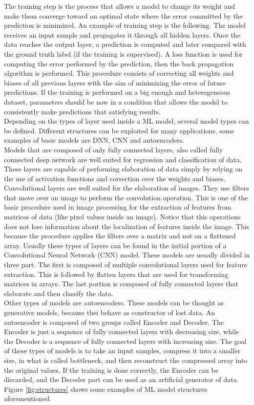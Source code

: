 \documentclass[12pt]{report}
\begin{document}
The training step is the process that allows a model to change its weight and make them converge toward an optimal state where the error committed by the prediction is minimized. An example of training step is the following. The model receives an input sample and propagates it through all hidden layers. Once the data reaches the output layer, a prediction is computed and later compared with the ground truth label (if the training is supervised). A loss function is used for computing the error performed by the prediction, then the back propagation algorithm is performed. This procedure consists of correcting all weights and biases of all previous layers with the aim of minimizing the error of future predictions. If the training is performed on a big enough and heterogeneous dataset, parameters should be now in a condition that allows the model to consistently make predictions that satisfying results.\\

Depending on the types of layer used inside a ML model, several model types can be defined. Different structures can be exploited for many applications, some examples of basic models are DNN, CNN and autoencoders. \\
Models that are composed of only fully connected layers, also called fully connected deep network are well suited for regression and classification of data. These layers are capable of performing elaboration of data simply by relying on the use of activation functions and correction over the weights and biases. 
Convolutional layers are well suited for the elaboration of images. They use filters that move over an image to perform the convolution operation. This is one of the basic procedure used in image processing for the extraction of features from matrices of data (like pixel values inside an image). Notice that this operations does not lose information about the localization of features inside the image. This because the procedure applies the filters over a matrix and not on a flattened array. Usually these types of layers can be found in the initial portion of a Convolutional Neural Network (CNN) model. These models are usually divided in three part. The first is composed of multiple convolutional layers used for feature extraction. This is followed by flatten layers that are used for transforming matrices in arrays. The last portion is composed of fully connected layers that elaborate and then classify the data.	\\
Other types of models are autoencoders. These models can be thought as generative models, because thei behave as constructor of lost data. An autoencoder is composed of two groups called Encoder and Decoder. The Encoder is just a sequence of fully connected layers with decreasing size, while the Decoder is a sequence of fully connected layers with increasing size. The goal of these types of models is to take an input samples, compress it into a smaller size, in what is called bottleneck, and then reconstruct the compressed array into the original values. If the training is done correctly, the Encoder can be discarded, and the Decoder part can be used as an artificial generator of data.\\
Figure \ref{fig:structures} shows some examples of ML model structures aforementioned.
\end{document}

